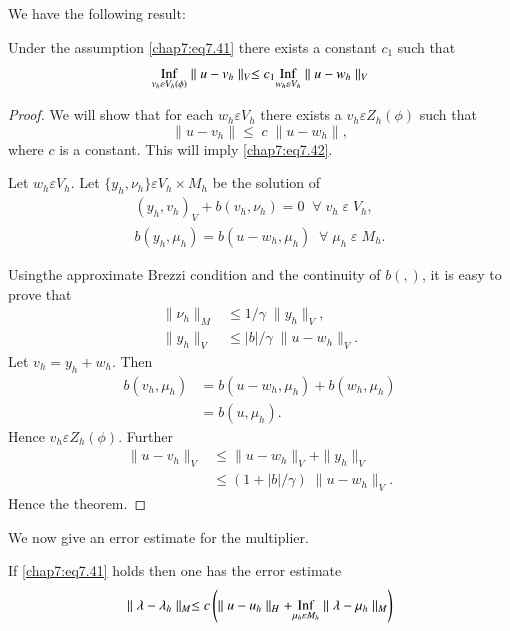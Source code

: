 We have the following result:

\begin{THM}\label{chap7:THM7}
Under the assumption \eqref{chap7:eq7.41} there exists a constant
$c_1$ such that 
\begin{equation}\label{chap7:eq7.42}
\underset{v_h\varepsilon V_h(\phi)}{\operatorname{Inf}}\parallel u-v_h\parallel_V
\leq c_1\underset{w_h\varepsilon V_h}{\operatorname{Inf}}\parallel u-w_h \parallel_V 
\end{equation}
\end{THM}

\begin{proof}
We will show that for each $w_h\varepsilon V_h$ there exists a
$v_h\varepsilon Z_h(\phi)$ such that 
$$
\parallel u-v_h\parallel \leq \;c\;\parallel u-w_h\parallel,
$$
where $c$ is a constant. This will imply \eqref{chap7:eq7.42}.

Let $w_h\varepsilon V_h$. Let $\{y_h,\nu_h\}\varepsilon V_h\times M_h$
be the solution of 
\begin{gather*}
(y_h,v_h)_V+b(v_h,\nu_h)=0\; \; \forall \;v_h\;\varepsilon \;V_h,\\
b(y_h,\mu_h)=b(u-w_h,\mu_h) \; \; \forall \;\mu_h\;\varepsilon \;M_h.
\end{gather*}

Using\pageoriginale the approximate Brezzi condition and the
continuity of $b(,)$, it is easy to prove that 
\begin{align*}
\parallel \nu_h\parallel_M &\leq 1/\gamma\;\parallel y_h
\parallel_V,\\
\parallel y_h\parallel_V &\leq |b|/\gamma\;\parallel u-w_h\parallel_V.
\end{align*}
Let $v_h=y_h+w_h$. Then 
\begin{align*}
b(v_h,\mu_h) &= b(u-w_h,\mu_h)+b(w_h,\mu_h)\\
&= b(u,\mu_h).
\end{align*}
Hence $v_h\varepsilon Z_h(\phi)$. Further
\begin{align*}
\parallel u-v_h\parallel_V &\leq \parallel u-w_h\parallel_V+\parallel
y_h\parallel_V\\
&\leq (1+|b|/\gamma)\;\parallel u-w_h\parallel_V.
\end{align*}
Hence the theorem.
\end{proof}

We now give an error estimate for the multiplier.
\begin{THM}\label{chap7:THM8}
If \eqref{chap7:eq7.41} holds then one has the error estimate 
\begin{equation}\label{chap7:eq7.43}
\parallel \lambda-\lambda_h\parallel_M\leq c\left(\parallel
u-u_h\parallel_H+\underset{\mu_h\varepsilon M_h}{\operatorname{Inf}}\parallel
\lambda -\mu_h\parallel_M\right)
\end{equation}
\end{THM}

